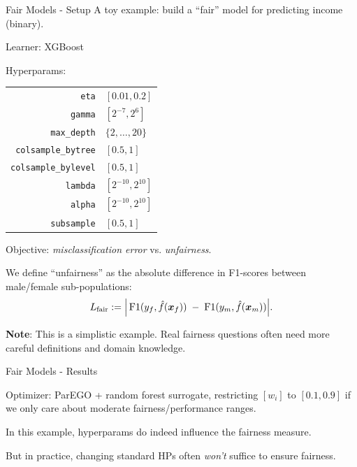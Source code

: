 \documentclass[11pt,compress,t,notes=noshow,xcolor=table]{beamer}
\begin{document}
\begin{framev}[fs=small]{Fair Models - Setup}
A toy example: build a ``fair'' model for predicting income (binary).
\begin{itemizeM}
\item Learner: XGBoost
\item Hyperparams:
\begin{tabular}{rl}
\texttt{eta} & $[0.01, 0.2]$ \\
\texttt{gamma} & $[2^{-7}, 2^6]$ \\
\texttt{max\_depth} & $\{2, \dots, 20\}$ \\
\texttt{colsample\_bytree} & $[0.5,1]$ \\
\texttt{colsample\_bylevel} & $[0.5,1]$ \\
\texttt{lambda} & $[2^{-10},2^{10}]$ \\
\texttt{alpha} & $[2^{-10},2^{10}]$ \\
\texttt{subsample} & $[0.5,1]$
\end{tabular}
\item Objective: \emph{misclassification error} vs. \emph{unfairness}.
\item We define ``unfairness'' as the absolute difference in F1-scores between male/female sub-populations:
$$
L_{\mathrm{fair}} :=
\Bigl|\,
\mathrm{F1}(y_f,\hat{f}(\bm{x}_f))
\; - \;
\mathrm{F1}(y_m,\hat{f}(\bm{x}_m))
\Bigr|.
$$
\end{itemizeM}
\textbf{Note}: This is a simplistic example. Real fairness questions often need more careful definitions and domain knowledge.
\end{framev}


\begin{framev}{Fair Models - Results}
\begin{itemizeM}
\item Optimizer: ParEGO + random forest surrogate, restricting $[w_i]$ to $[0.1,0.9]$ if we only care about moderate fairness/performance ranges.
\item In this example, hyperparams do indeed influence the fairness measure.
\item But in practice, changing standard HPs often \emph{won't} suffice to ensure fairness.
\end{itemizeM}
\end{framev}

\endlecture
\end{document}
